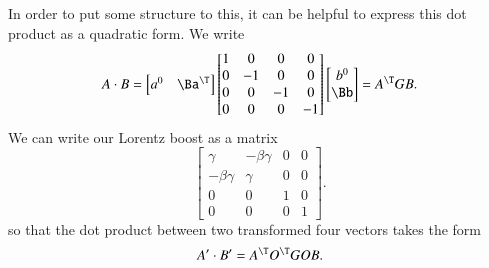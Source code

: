 In order to put some structure to this, it can be helpful to express this dot product as a quadratic form.  We write
%
\begin{equation}\label{eqn:relativisticElectrodynamicsT1:100}
\begin{aligned}
A \cdot B =
\begin{bmatrix}
a^0 & \Ba^\T
\end{bmatrix}
\begin{bmatrix}
1 & 0 & 0 & 0 \\
0 & -1 & 0 & 0 \\
0 & 0 & -1 & 0 \\
0 & 0 & 0 & -1
\end{bmatrix}
\begin{bmatrix}
b^0 \\
\Bb
\end{bmatrix}
= A^\T G B.
\end{aligned}
\end{equation}
%
We can write our Lorentz boost as a matrix
%
\begin{equation}\label{eqn:relativisticElectrodynamicsT1:110}
\begin{bmatrix}
\gamma & -\beta \gamma & 0 & 0 \\
-\beta \gamma & \gamma & 0 & 0 \\
0 & 0 & 1 & 0 \\
0 & 0 & 0 & 1
\end{bmatrix}.
\end{equation}
%
so that the dot product between two transformed four vectors takes the form
%
\begin{equation}\label{eqn:relativisticElectrodynamicsT1:120}
A' \cdot B' = A^\T O^\T G O B.
\end{equation}
